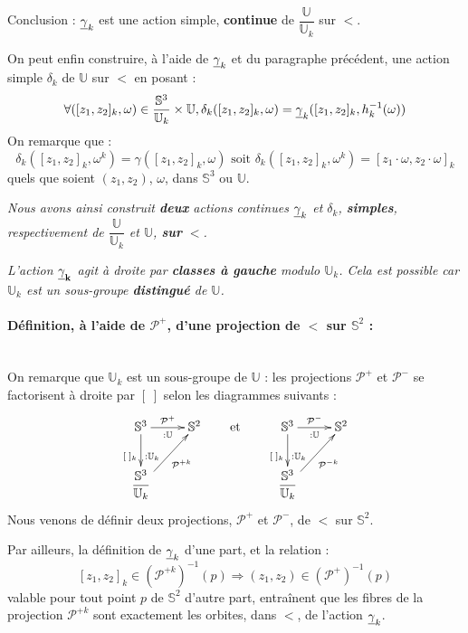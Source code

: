 \par
Conclusion : $\underline{\gamma}_{k}$ est une action simple, \textbf{continue} de $\dfrac{\mathbb{U}}{\mathbb{U}_k}$ sur $\lt$.

\par
On peut enfin construire, \`a l'aide de $\underline{\gamma}_{k}$ et du paragraphe pr\'ec\'edent, une action simple $\delta_k$ de $\mathbb{U}$ sur $\lt$ en posant :
\[\forall ([z_1,z_2]_k,\omega)\in\dfrac{\mathbb{S}^3}{\mathbb{U}_{k}}\times\mathbb{U},\delta_k([z_1,z_2]_k,\omega)=\underline{\gamma}_{k}([z_1,z_2]_k,h_k^{-1}(\omega))\]
On remarque que :
\[\delta_k\left([z_1,z_2]_k,\omega^k\right)=\gamma([z_1,z_2]_k,\omega)\text{ soit }\delta_k\left([z_1,z_2]_k,\omega^k\right)=[z_1\cdot\omega,z_2\cdot\omega]_k\]
quels que soient $(z_1,z_2)$, $\omega$, dans $\mathbb{S}^3$ ou $\mathbb{U}$.

\par
\emph{Nous avons ainsi construit \textbf{deux} actions continues $\underline{\gamma}_{k}$ et $\delta_k$, \textbf{simples}, respectivement de $\dfrac{\mathbb{U}}{\mathbb{U}_k}$ et $\mathbb{U}$, %
\textbf{sur} $\mathbf{\lt}$.}

\par
\emph{L'action $\mathbf{\underline{\gamma}_{k}}$ agit \`a droite par \textbf{classes \`a gauche} modulo $\mathbb{U}_k$. %
Cela est possible car $\mathbb{U}_k$ est un sous-groupe \textbf{distingu\'e} de $\mathbb{U}$.}

\paragraph{D\'efinition, \`a l'aide de $\mathcal{P}^+$, d'une projection de $\lt$ sur $\mathbb{S}^2$ :}~\\

On remarque que $\mathbb{U}_k$ est un sous-groupe de $\mathbb{U}$ : les projections $\mathcal{P}^+$ et $\mathcal{P}^-$ se factorisent \`a droite par $[\; ]$ selon les diagrammes suivants :
\[%
\xymatrix{%
\mathbb{S}^3\ar[d]_{[\; ]_k}^{:\mathbb{U}_k}\ar[r]^{\mathcal{P}^+}_{:\mathbb{U}}&\mathbb{S}^2\\%
\lt\ar[ru]_{\mathcal{P}^{+k}}&%
}%
\qquad\text{et}\qquad%
\xymatrix{%
\mathbb{S}^3\ar[d]_{[\; ]_k}^{:\mathbb{U}_k}\ar[r]^{\mathcal{P}^-}_{:\mathbb{U}}&\mathbb{S}^2\\%
\lt\ar[ru]_{\mathcal{P}^{-k}}&%
}%
\]
Nous venons de d\'efinir deux projections, $\mathcal{P}^+$ et $\mathcal{P}^-$, de $\lt$ sur $\mathbb{S}^2$.

\par
Par ailleurs, la d\'efinition de $\underline{\gamma}_{k}$ d'une part, et la relation :
\[[z_1,z_2]_k\in\left(\mathcal{P}^{+k}\right)^{-1}(p)\Rightarrow (z_1,z_2)\in\left(\mathcal{P}^+\right)^{-1}(p)\]\label{inc}
valable pour tout point $p$ de $\mathbb{S}^2$ d'autre part, entra\^inent que les fibres de la projection $\mathcal{P}^{+k}$ %
sont exactement les orbites, dans $\lt$, de l'action $\underline{\gamma}_{k}$.


